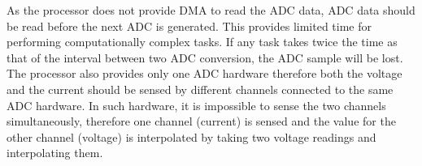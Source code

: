 As the processor does not provide DMA to read the ADC data, ADC data should be read before the next ADC is generated. This provides limited time for performing computationally complex tasks. If any task takes twice the time as that of the interval between two ADC conversion, the ADC sample will be lost. The processor also provides only one ADC hardware therefore both the voltage and the current should be sensed by different channels connected to the same ADC hardware. In such hardware, it is impossible to sense the two channels simultaneously, therefore one channel (current) is sensed and the value for the other channel (voltage) is interpolated by taking two voltage readings and interpolating them.
